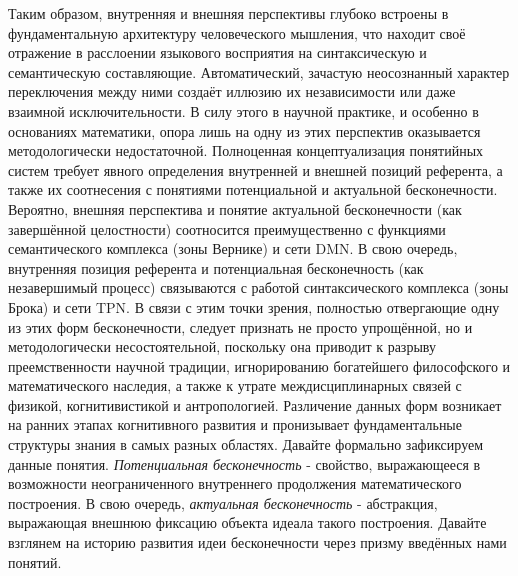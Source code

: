 \documentclass[12pt]{article}
\begin{document}
Таким образом, внутренняя и внешняя перспективы глубоко встроены в фундаментальную архитектуру человеческого мышления, что находит своё отражение в расслоении языкового восприятия на синтаксическую и семантическую составляющие. Автоматический, зачастую неосознанный характер переключения между ними создаёт иллюзию их независимости или даже взаимной исключительности. В силу этого в научной практике, и особенно в основаниях математики, опора лишь на одну из этих перспектив оказывается методологически недостаточной. Полноценная концептуализация понятийных систем требует явного определения внутренней и внешней позиций референта, а также их соотнесения с понятиями потенциальной и актуальной бесконечности. Вероятно, внешняя перспектива и понятие актуальной бесконечности (как завершённой целостности) соотносится преимущественно с функциями семантического комплекса (зоны Вернике) и сети DMN. В свою очередь, внутренняя позиция референта и потенциальная бесконечность (как незавершимый процесс) связываются с работой синтаксического комплекса (зоны Брока) и сети TPN. В связи с этим точки зрения, полностью отвергающие одну из этих форм бесконечности, следует признать не просто упрощённой, но и методологически несостоятельной, поскольку она приводит к разрыву преемственности научной традиции, игнорированию богатейшего философского и математического наследия, а также к утрате междисциплинарных связей с физикой, когнитивистикой и антропологией. Различение данных форм возникает на ранних этапах когнитивного развития и пронизывает фундаментальные структуры знания в самых разных областях. Давайте формально зафиксируем данные понятия. {\it Потенциальная бесконечность} - свойство, выражающееся в возможности неограниченного внутреннего продолжения математического построения. В свою очередь, {\it актуальная бесконечность} - абстракция, выражающая внешнюю фиксацию объекта идеала такого построения. Давайте взглянем на историю развития идеи бесконечности через призму введённых нами понятий. 
\end{document}

